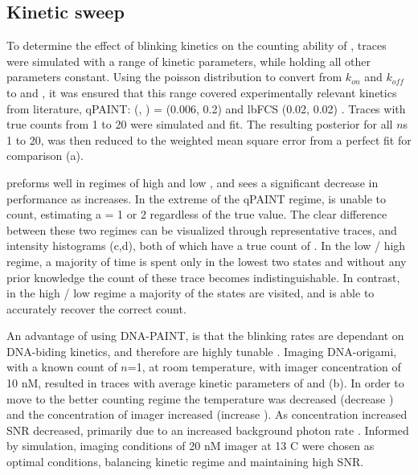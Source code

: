 \subsection{Kinetic sweep}
To determine the effect of blinking kinetics on the counting ability of \ours, traces were simulated with a range of kinetic parameters, 
	while holding all other parameters constant.
	Using the poisson distribution to convert from $k_{on}$ and $k_{off}$ to \pon and \poff,
	it was ensured that this range covered experimentally relevant kinetics from literature,
	qPAINT: (\pon, \poff) = (0.006, 0.2) \cite{jungmann_2016} and lbFCS (0.02, 0.02) \cite{stein_2021}. 
	Traces with true counts from 1 to 20 were simulated and fit.
	The resulting posterior for all $n$s 1 to 20, was then reduced to the weighted mean square error from a perfect fit for comparison (a).
	
\ours preforms well in regimes of high \pon and low \poff, and sees a significant decrease in performance as \poff increases. 
	In the extreme of the qPAINT regime, \ours is unable to count, estimating a \n = 1 or 2 regardless of the true value.
	The clear difference between these two regimes can be visualized through representative traces, and intensity histograms (c,d),
	both of which have a true count of .
	In the low \pon / high \poff regime, a majority of time is spent only in the lowest two states and without 
	any prior knowledge the count of these trace becomes indistinguishable.
	In contrast, in the high \pon / low \poff regime a majority of the states are visited, and \ours 
	is able to accurately recover the correct count.

An advantage of using DNA-PAINT, is that the blinking rates are dependant on DNA-biding kinetics,
	and therefore are highly tunable \cite{wade_2019, strauss_2020}. %
	Imaging DNA-origami, with a known count of $n$=1, at room temperature, with imager concentration of 10 nM, 
	resulted in traces with average kinetic parameters of  and  (b). 
	In order to move to the better counting regime the temperature was decreased (decrease \poff) 
	and the concentration of imager increased (increase \pon).
	As concentration increased SNR decreased, primarily due to an increased background photon rate \rb.
	Informed by simulation, imaging conditions of 20 nM imager at 13 C were chosen as optimal conditions,
	balancing kinetic regime and maintaining high SNR.



